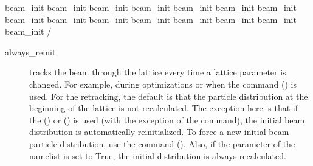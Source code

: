 {{{{{{{{{{{{\begin{example}
    beam_init%
    beam_init%
    beam_init%
    beam_init%
    beam_init%
    beam_init%
    beam_init%
    beam_init%
    beam_init%
    beam_init%
    beam_init%
    beam_init%
    beam_init%
    beam_init%
    beam_init%
  /
\end{example}

\begin{description}
%
\item[always_reinit] \Newline
\tao tracks the beam through the lattice every time a lattice parameter is changed. For example,
during optimizations or when the  command () is used. For the retracking, the
default is that the particle distribution at the beginning of the lattice is not recalculated. The
exception here is that if the  () or 
() is used (with the exception of the  command), the
initial beam distribution is automatically reinitialized. To force a new initial beam particle
distribution, use the  command (). Also, if the
 parameter of the  namelist is set to True, the initial
distribution is always recalculated.


\end{description}}}}}}}}}}}}}
